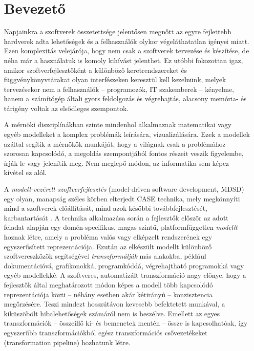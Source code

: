 \chapter*{Bevezető}


Napjainkra a szoftverek összetettsége jelentősen megnőtt az egyre fejlettebb hardverek adta lehetőségek és a felhasználók olykor végeláthatatlan igényei miatt.
Ezen komplexitás velejárója, hogy nem csak a szoftverek tervezése és készítése, de néha már a használatuk is komoly kihívást jelenthet.
Ez utóbbi fokozottan igaz, amikor szoftverfejlesztőként a különböző keretrendszereket és függvénykönyvtárakat olyan interfészeken keresztül kell kezelnünk, melyek tervezésekor nem a felhasználók -- programozók, IT szakemberek -- kényelme, hanem a számítógép általi gyors feldolgozás és végrehajtás, alacsony memória- és tárigény voltak az elsődleges szempontok.

A mérnöki diszciplínákban szinte mindenhol alkalmaznak matematikai vagy egyéb modelleket a komplex problémák leírására, vizualizálására.
Ezek a modellek azáltal segítik a mérnökök munkáját, hogy a világnak csak a problémához szorosan kapcsolódó, a megoldás szempontjából fontos részeit veszik figyelembe, írják le vagy jelenítik meg.
Nem meglepő módon, az informatika sem képez kivétel ez alól.

A \emph{modell-vezérelt szoftverfejlesztés} (model-driven software development, \gls{MDSD}) egy olyan, manapság széles körben elterjedt \gls{CASE} technika, mely megkönnyíti mind a szoftverek előállítását, mind azok későbbi továbbfejlesztését, karbantartását \cite{MDSD:TEM06}.
A technika alkalmazása során a fejlesztők először az adott feladat alapján egy domén-specifikus, magas szintű, platformfüggetlen \emph{modellt} hoznak létre, amely a probléma valós vagy elképzelt rendszerének egy egyszerűsített reprezentációja.
Ezután az elkészült modellt különböző szoftvereszközök segítségével \emph{transzformálják} más alakokba, például dokumentációvá, grafikonokká, programkóddá, végrehajtható programokká vagy egyéb modellekké.
A szoftveres, automatizált transzformáció nagy előnye, hogy a fejlesztők által meghatározott módon képes a modell több kapcsolódó reprezentációja közti -- néhány esetben akár kétirányú -- konzisztencia megőrzésére.
Teszi mindezt hosszútávon kevesebb befektetett munkával, a kiküszöbölt hibalehetőségek számáról nem is beszélve.
Emellett az egyes transzformációk -- összeillő ki- és bemenetek mentén -- össze is kapcsolhatóak, így egyszerűbb transzformációkból egész transzformációs csővezetékeket (transformation pipeline) hozhatunk létre.

